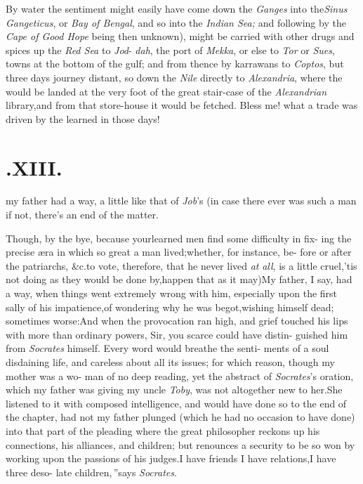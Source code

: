 \documentclass{article}
\begin{document}
By water the sentiment might easily have come down the
\textit{Ganges} into the\break \textit{Sinus Gangeticus}, or \textit{Bay of
Bengal}, and so into the \textit{Indian Sea;} and following\break
{} by the \textit{Cape of Good
Hope} being then un\-known), might be carried with other\break
drugs and spices up the \textit{Red Sea} to \textit{Jod}- \textit{dah}, the port of
\textit{Mekka}, or else to \textit{Tor}\break
or \textit{Sues}, towns at the bottom of the gulf;\break
and from thence by karrawans to \textit{Coptos},\break
but three days journey distant, so down\break
the \textit{Nile} directly to \textit{Alexandria}, where\break
the  would be landed at the\break
very foot of the great stair-case of the\break
\textit{Alexandrian} library,\tsh and from that\break
store-house it would be fetched.\tsh\break
Bless me! what a trade was driven by\break
the learned in those days!

\section{.\enspace  XIII.}
\setlength{\baselineskip}{14pt}  %

 my father had a way,
a little like that of \textit{Job}’s\break
(in case there ever was such a man\tsh\break 
if not, there’s an end of the matter.\tsh

Though, by the bye, because your\break learned men find some
difficulty in fix-
ing the precise æra in which so great a\break
man lived;\tsk whether, for instance, be-\break
fore or after the patriarchs, \&c.\tsk to\break
vote, therefore, that he never lived \textit{at}\break
\textit{all}, is a little cruel,\tsk ’tis not doing as\break
they would be done by,\tsk happen that as\break
it may)\tsk My father, I say, had a\break
way, when things went extremely wrong\break
with him, especially upon the first sally\break
of his impatience,\tsk of wondering why\break
he was begot,\tsk wishing himself dead;\tsk\break
sometimes worse:\tsk And when the\break
provocation ran high, and grief touched\break
his lips with more than ordinary powers,\break
\tsk Sir, you scarce could have distin-\break
guished him from \textit{Socrates} himself.\tsh\break
Every word would breathe the senti-\break
ments of a soul disdaining life, and\break
careless about all its issues; for which\break
reason, though my mother was a wo-\break
man of no deep reading, yet the abstract
of
\textit{Socrates}’s oration, which my
father was giving my uncle \textit{Toby},
was not altogether new to her.\tsk She
listened to it with composed intelligence,
and would have done so to the end of the
chapter, had not my father plunged (which
he had no occasion to have done) into that
part of the pleading where the great
philosopher reckons up his connections,
his alliances, and children; but renounces
a security to be so won by working upon the passions
of his judges.\tsk \lqq I have friends\tsk\break
\lqq I have relations,\tsk I have three deso-\break
\lqq late children,\,”\tsk says \textit{Socrates}.\tsk
\end{document}
